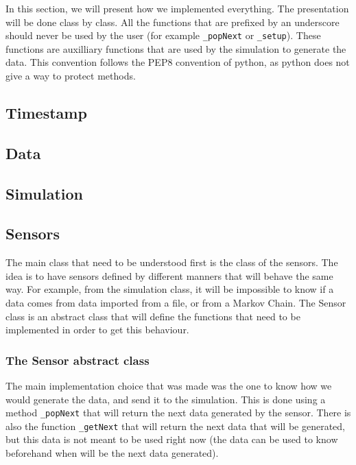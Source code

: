 
In this section, we will present how we implemented everything. The presentation will be done class by class. All the functions that are prefixed by an underscore should never be used by the user (for example \verb!_popNext! or \verb!_setup!). These functions are auxilliary functions that are used by the simulation to generate the data. This convention follows the PEP8 convention of python, as python does not give a way to protect methods.

\subsection{Timestamp}



\subsection{Data}



\subsection{Simulation}




\subsection{Sensors}


The main class that need to be understood first is the class of the sensors. The idea is to have sensors defined by different manners that will behave the same way. For example, from the simulation class, it will be impossible to know if a data comes from data imported from a file, or from a Markov Chain. The Sensor class is an abstract class that will define the functions that need to be implemented in order to get this behaviour.

\subsubsection{The Sensor abstract class}

The main implementation choice that was made was the one to know how we would generate the data, and send it to the simulation. This is done using a method \verb!_popNext! that will return the next data generated by the sensor. There is also the function \verb!_getNext! that will return the next data that will be generated, but this data is not meant to be used right now (the data can be used to know beforehand when will be the next data generated).

